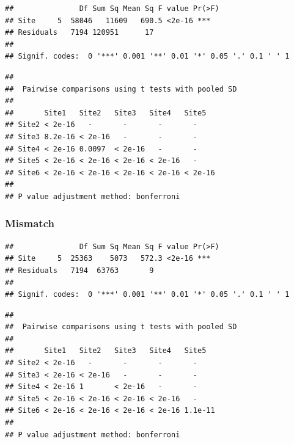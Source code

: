 \documentclass[12 pt]{article}
\begin{document}
\begin{verbatim}
##               Df Sum Sq Mean Sq F value Pr(>F)    
## Site     5  58046   11609   690.5 <2e-16 ***
## Residuals   7194 120951      17                   
## 
## Signif. codes:  0 '***' 0.001 '**' 0.01 '*' 0.05 '.' 0.1 ' ' 1
\end{verbatim}

\begin{verbatim}
## 
##  Pairwise comparisons using t tests with pooled SD 
##  
##       Site1   Site2   Site3   Site4   Site5  
## Site2 < 2e-16   -       -       -       -      
## Site3 8.2e-16 < 2e-16   -       -       -      
## Site4 < 2e-16 0.0097  < 2e-16   -       -      
## Site5 < 2e-16 < 2e-16 < 2e-16 < 2e-16   -      
## Site6 < 2e-16 < 2e-16 < 2e-16 < 2e-16 < 2e-16
## 
## P value adjustment method: bonferroni
\end{verbatim}

\subsubsection*{Mismatch}

\begin{verbatim}
##               Df Sum Sq Mean Sq F value Pr(>F)    
## Site     5  25363    5073   572.3 <2e-16 ***
## Residuals   7194  63763       9                   
## 
## Signif. codes:  0 '***' 0.001 '**' 0.01 '*' 0.05 '.' 0.1 ' ' 1
\end{verbatim}

\begin{verbatim}
## 
##  Pairwise comparisons using t tests with pooled SD 
## 
##       Site1   Site2   Site3   Site4   Site5  
## Site2 < 2e-16   -       -       -       -      
## Site3 < 2e-16 < 2e-16   -       -       -      
## Site4 < 2e-16 1       < 2e-16   -       -      
## Site5 < 2e-16 < 2e-16 < 2e-16 < 2e-16   -      
## Site6 < 2e-16 < 2e-16 < 2e-16 < 2e-16 1.1e-11
## 
## P value adjustment method: bonferroni
\end{verbatim}
\end{document}
